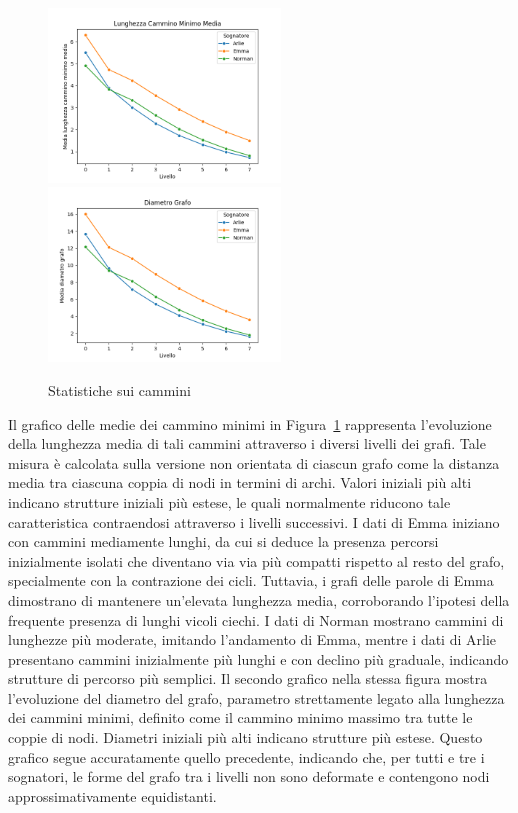 \begin{figure}
    \vspace{-10pt}
    \includegraphics[width=0.55\textwidth]{Immagini/lunghezza_cammino_minimo_media}
    \includegraphics[width=0.55\textwidth]{Immagini/diametro_grafo}
    \caption{Statistiche sui cammini}\label{fig:paths}
    \vspace{-10pt}
\end{figure}

Il grafico delle medie dei cammino minimi in Figura~\ref{fig:paths} rappresenta l'evoluzione della lunghezza media di
tali cammini attraverso i diversi livelli dei grafi.
Tale misura è calcolata sulla versione non orientata di ciascun grafo come la distanza media tra ciascuna coppia di
nodi in termini di archi.
Valori iniziali più alti indicano strutture iniziali più estese, le quali normalmente riducono tale caratteristica
contraendosi attraverso i livelli successivi.
I dati di Emma iniziano con cammini mediamente lunghi, da cui si deduce la presenza percorsi inizialmente isolati
che diventano via via più compatti rispetto al resto del grafo, specialmente con la contrazione dei cicli.
Tuttavia, i grafi delle parole di Emma dimostrano di mantenere un'elevata lunghezza media, corroborando l'ipotesi
della frequente presenza di lunghi vicoli ciechi.
I dati di Norman mostrano cammini di lunghezze più moderate, imitando l'andamento di Emma,
mentre i dati di Arlie presentano cammini inizialmente più lunghi e con declino più graduale, indicando strutture di
percorso più semplici.
Il secondo grafico nella stessa figura mostra l'evoluzione del diametro del grafo, parametro strettamente legato
alla lunghezza dei cammini minimi, definito come il cammino minimo massimo tra tutte le coppie di nodi.
Diametri iniziali più alti indicano strutture più estese.
Questo grafico segue accuratamente quello precedente, indicando che, per tutti e tre i sognatori, le forme del grafo
tra i livelli non sono deformate e contengono nodi approssimativamente equidistanti.

